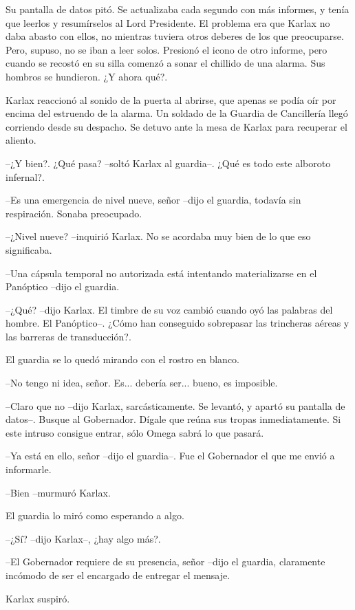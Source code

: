 Su pantalla de datos pitó. Se actualizaba cada segundo con más informes, y tenía que leerlos y resumírselos al Lord Presidente. El problema era que Karlax no daba abasto con ellos, no mientras tuviera otros deberes de los que preocuparse. Pero, supuso, no se iban a leer solos. Presionó el icono de otro informe, pero cuando se recostó en su silla comenzó a sonar el chillido de una alarma. Sus hombros se hundieron. ¿Y ahora qué?.

Karlax reaccionó al sonido de la puerta al abrirse, que apenas se podía oír por encima del estruendo de la alarma. Un soldado de la Guardia de Cancillería llegó corriendo desde su despacho. Se detuvo ante la mesa de Karlax para recuperar el aliento.

--¿Y bien?. ¿Qué pasa? --soltó Karlax al guardia--. ¿Qué es todo este alboroto infernal?.

--Es una emergencia de nivel nueve, señor --dijo el guardia, todavía sin respiración. Sonaba preocupado.

--¿Nivel nueve? --inquirió Karlax.  No se acordaba muy bien de lo que eso significaba.

--Una cápsula temporal no autorizada está intentando materializarse en el Panóptico --dijo el guardia.

--¿Qué? --dijo Karlax. El timbre de su voz cambió cuando oyó las palabras del hombre. El Panóptico--. ¿Cómo han conseguido sobrepasar las trincheras aéreas y las barreras de transducción?. 

El guardia se lo quedó mirando con el rostro en blanco.

--No tengo ni idea, señor. Es... debería ser... bueno, es imposible.

--Claro que no --dijo Karlax, sarcásticamente. Se levantó, y apartó su pantalla de datos--. Busque al Gobernador. Dígale que reúna sus tropas inmediatamente. Si este intruso consigue entrar, sólo Omega sabrá lo que pasará.

--Ya está en ello, señor --dijo el guardia--. Fue el Gobernador el que me envió a informarle.

--Bien --murmuró Karlax.

El guardia lo miró como esperando a algo.

--¿Sí? --dijo Karlax--, ¿hay algo más?.

--El Gobernador requiere de su presencia, señor --dijo el guardia, claramente incómodo de ser el encargado de entregar el mensaje.

Karlax suspiró.

